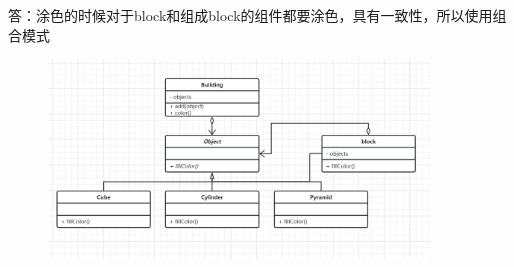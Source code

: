 \documentclass{article}
\begin{document}
\vspace{1em}

答：涂色的时候对于block和组成block的组件都要涂色，具有一致性，所以使用组合模式

\begin{figure}[H]
    \centering
    \includegraphics[width=0.9\textwidth]{UML5.png}
\end{figure} 
\end{document}
